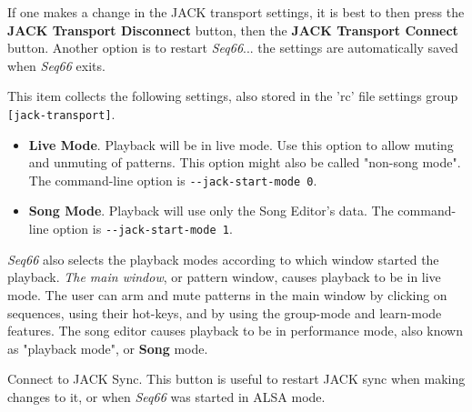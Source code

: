 
   If one makes a change in the JACK transport settings, it is best to
   then press the \textbf{JACK Transport Disconnect} button, then the
   \textbf{JACK Transport Connect} button.  Another option is to restart
   \textsl{Seq66}... the settings are automatically saved when
   \textsl{Seq66} exits.

   This item collects the following settings, also stored in the 'rc' file
   settings group \texttt{[jack-transport]}.

   \begin{itemize}
      \item \textbf{Live Mode}.
         Playback will be in live mode.  Use this option to allow muting and
         unmuting of patterns.  This option might also be called "non-song
         mode".
         The command-line option is \texttt{-{}-jack-start-mode 0}.
      \item \textbf{Song Mode}.
         Playback will use only the Song Editor's data.
         The command-line option is \texttt{-{}-jack-start-mode 1}.
   \end{itemize}

   \textsl{Seq66} also selects the playback modes
   according to which window started the playback.
   \textsl{The main window}, or pattern
   window, causes playback to be in live mode.  The user can arm and mute
   patterns in the main window by clicking on sequences, using their hot-keys,
   and by using the group-mode and learn-mode features.
   The song editor causes playback to be in performance mode, also known as
   "playback mode", or \textbf{Song} mode.

   Connect to JACK Sync.
   This button is useful to restart JACK sync when making changes to it,
   or when \textsl{Seq66} was started in ALSA mode.

